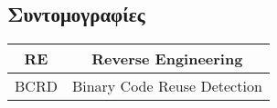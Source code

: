 \documentclass[12pt]{article}
\begin{document}
\begin{greek}


\pagebreak
\tableofcontents

\pagebreak


\pagebreak
\listoffigures

\pagebreak
\listoftables 

\pagebreak
\section*{Συντομογραφίες}
\begin{table}[ht]
\centering
\begin{tabular}{| c | c |}
\hline
RE & Reverse Engineering \\
\hline
BCRD & Binary Code Reuse Detection \\
\hline
\end{tabular}
\end{table}
\pagebreak 



\pagebreak

\pagebreak

\pagebreak

\pagebreak

\pagebreak

\pagebreak



\end{greek}
\end{document}
